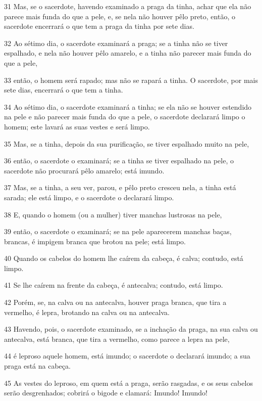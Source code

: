 \par 31 Mas, se o sacerdote, havendo examinado a praga da tinha, achar que ela não parece mais funda do que a pele, e, se nela não houver pêlo preto, então, o sacerdote encerrará o que tem a praga da tinha por sete dias.
\par 32 Ao sétimo dia, o sacerdote examinará a praga; se a tinha não se tiver espalhado, e nela não houver pêlo amarelo, e a tinha não parecer mais funda do que a pele,
\par 33 então, o homem será rapado; mas não se rapará a tinha. O sacerdote, por mais sete dias, encerrará o que tem a tinha.
\par 34 Ao sétimo dia, o sacerdote examinará a tinha; se ela não se houver estendido na pele e não parecer mais funda do que a pele, o sacerdote declarará limpo o homem; este lavará as suas vestes e será limpo.
\par 35 Mas, se a tinha, depois da sua purificação, se tiver espalhado muito na pele,
\par 36 então, o sacerdote o examinará; se a tinha se tiver espalhado na pele, o sacerdote não procurará pêlo amarelo; está imundo.
\par 37 Mas, se a tinha, a seu ver, parou, e pêlo preto cresceu nela, a tinha está sarada; ele está limpo, e o sacerdote o declarará limpo.
\par 38 E, quando o homem (ou a mulher) tiver manchas lustrosas na pele,
\par 39 então, o sacerdote o examinará; se na pele aparecerem manchas baças, brancas, é impigem branca que brotou na pele; está limpo.
\par 40 Quando os cabelos do homem lhe caírem da cabeça, é calva; contudo, está limpo.
\par 41 Se lhe caírem na frente da cabeça, é antecalva; contudo, está limpo.
\par 42 Porém, se, na calva ou na antecalva, houver praga branca, que tira a vermelho, é lepra, brotando na calva ou na antecalva.
\par 43 Havendo, pois, o sacerdote examinado, se a inchação da praga, na sua calva ou antecalva, está branca, que tira a vermelho, como parece a lepra na pele,
\par 44 é leproso aquele homem, está imundo; o sacerdote o declarará imundo; a sua praga está na cabeça.
\par 45 As vestes do leproso, em quem está a praga, serão rasgadas, e os seus cabelos serão desgrenhados; cobrirá o bigode e clamará: Imundo! Imundo!
